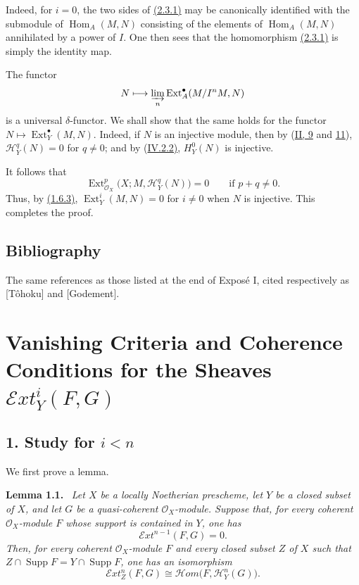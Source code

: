 \documentclass[11pt,a4paper,oneside]{book}
\providecommand{\SheafH}{\mathcal H}
\providecommand{\SheafHom}{\mathcal H\!om}
\providecommand{\SheafExt}{\mathcal E\!xt}
\providecommand{\OX}{\mathcal O_X}
\providecommand{\Supp}{\operatorname{Supp}}
\providecommand{\Homop}{\operatorname{Hom}}
\providecommand{\Ext}{\operatorname{Ext}}
\newenvironment{sgastatement}[1]
  {\par\addvspace{0.8\baselineskip}\noindent\textbf{#1.}\ \itshape}
  {\par\addvspace{0.35\baselineskip}}
\theoremstyle{plain}
\theoremstyle{definition}
\theoremstyle{remark}
\begin{document}
Indeed, for $i=0$, the two sides of \hyperref[VI.2.3.1]{(2.3.1)} may be canonically identified with
the submodule of $\Homop_A(M,N)$ consisting of the elements of
$\Homop_A(M,N)$ annihilated by a power of $I$. One then sees that the
homomorphism \hyperref[VI.2.3.1]{(2.3.1)} is simply the identity map.

The functor
\[
 N\longmapsto \varinjlim_n \Ext_A^{\bullet}(M/I^nM,N)
\]
is a universal $\delta$-functor. We shall show that the same holds for the
functor $N\longmapsto \Ext_Y^{\bullet}(M,N)$. Indeed, if $N$ is an injective
module, then by \textup{(\hyperref[II.9]{II, 9} and \hyperref[II.11]{11})}, $\SheafH_Y^q(N)=0$ for $q\ne0$; and
by \textup{(\hyperref[IV.2.2]{IV.2.2)}}, $H_Y^0(N)$ is injective.

It follows that
\[
 \Ext_{\OX}^{p}\bigl(X;M,\SheafH_Y^q(N)\bigr)=0
 \qquad\text{if }p+q\ne0.
\]
Thus, by \hyperref[VI.1.6.3]{(1.6.3)}, $\Ext_Y^i(M,N)=0$ for $i\ne0$ when $N$ is injective. This
completes the proof.

\section*{Bibliography}
The same references as those listed at the end of Expos\'e I, cited
respectively as [T\^ohoku] and [Godement].


\makeatletter
\providecommand{\sgareaderlabel}[2]{%
  \begingroup
  \def\@currentlabel{#2}%
  \phantomsection\label{#1}%
  \endgroup}
\makeatother

\chapter[Vanishing and Coherence Criteria]
{Vanishing Criteria and Coherence Conditions for the Sheaves
$\SheafExt_Y^i(F,G)$}
\label{VII}

\section*{1. Study for $i<n$}
\sgareaderlabel{VII.1}{1}

We first prove a lemma.

\begin{sgastatement}{Lemma 1.1}\sgareaderlabel{VII.1.1}{1.1}
Let $X$ be a locally Noetherian prescheme, let $Y$ be a closed subset of $X$,
and let $G$ be a quasi-coherent $\OX$-module. Suppose that, for every coherent
$\OX$-module $F$ whose support is contained in $Y$, one has
\[
  \SheafExt^{n-1}(F,G)=0.
\]
Then, for every coherent $\OX$-module $F$ and every closed subset $Z$ of $X$
such that $Z\cap\Supp F=Y\cap\Supp F$, one has an isomorphism
\[
  \SheafExt_Z^n(F,G)\cong
  \SheafHom\bigl(F,\SheafH_Y^n(G)\bigr).
\]
\end{sgastatement}
\end{document}
